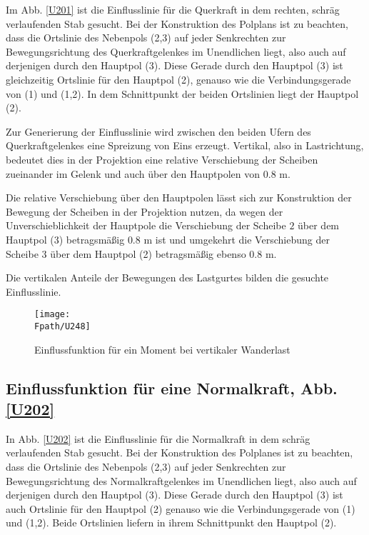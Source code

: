 Im Abb. \ref{U201} ist die Einflusslinie f\"{u}r die Querkraft in dem rechten, schr\"{a}g verlaufenden Stab gesucht. Bei der Konstruktion des Polplans ist zu beachten, dass die Ortslinie des Nebenpols (2,3) auf jeder Senkrechten zur Bewegungsrichtung des Querkraftgelenkes im Unendlichen liegt, also auch auf derjenigen durch den Hauptpol (3). Diese Gerade durch den Hauptpol (3) ist gleichzeitig Ortslinie f\"{u}r den Hauptpol (2), genauso wie die Verbindungsgerade von (1) und (1,2). In dem Schnittpunkt der beiden Ortslinien liegt der Hauptpol (2).

Zur Generierung der Einflusslinie wird zwischen den beiden Ufern des Querkraftgelenkes eine Spreizung von Eins erzeugt. Vertikal, also in Lastrichtung, bedeutet dies in der Projektion eine relative Verschiebung der Scheiben zueinander im Gelenk und auch \"{u}ber den Hauptpolen von $0.8$ m.

Die relative Verschiebung \"{u}ber den Hauptpolen l\"{a}sst sich zur Konstruktion der Bewegung der Scheiben in der Projektion nutzen, da wegen der Unverschieblichkeit der Hauptpole die Verschiebung der Scheibe $2$ \"{u}ber dem Hauptpol (3) betragsm\"{a}{\ss}ig $0.8$ m ist und umgekehrt die Verschiebung der Scheibe $3$ \"{u}ber dem Hauptpol (2) betragsm\"{a}{\ss}ig ebenso $0.8$ m.

Die vertikalen Anteile der Bewegungen des Lastgurtes bilden die gesuchte Einfluss\-linie.

\begin{figure}[tbp]
\centering
\if {} \sidecaption \fi
\texttt{[image: \\Fpath/U248]}
\caption{Einflussfunktion f\"{u}r ein Moment bei vertikaler Wanderlast} \label{U248}
\end{figure}%


{\textcolor{sectionTitleBlue}{\subsection{Einflussfunktion f\"{u}r eine Normalkraft, Abb. \ref{U202}}}}

In Abb. \ref{U202} ist die Einflusslinie f\"{u}r die Normalkraft in dem schr\"{a}g verlaufenden Stab gesucht. Bei der Konstruktion des Polplanes ist zu beachten, dass die Ortslinie des Nebenpols (2,3) auf jeder Senkrechten zur Bewegungsrichtung des Normalkraftgelenkes im Unendlichen liegt, also auch auf derjenigen durch den Hauptpol (3). Diese Gerade durch den Hauptpol (3) ist auch Ortslinie f\"{u}r den Hauptpol (2) genauso wie die Verbindungsgerade von (1) und (1,2). Beide Ortslinien liefern in ihrem Schnittpunkt den Hauptpol (2).

